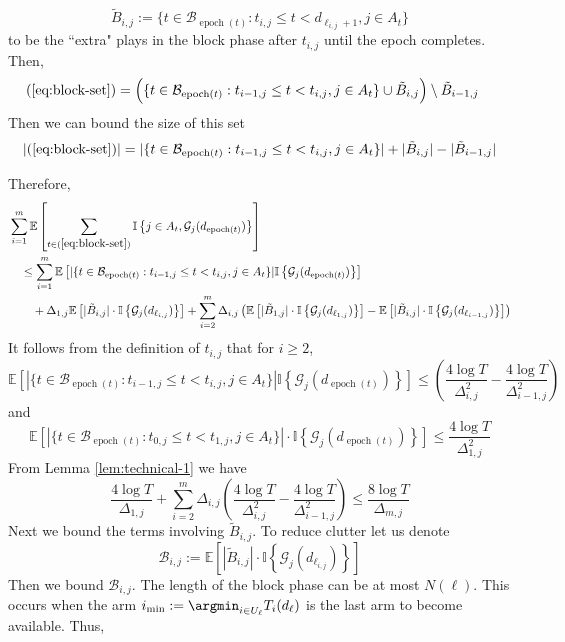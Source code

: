 \documentclass[opre,blindrev]{informs3}
\newcommand{\epoch}{\operatorname{epoch}}
\newcommand{\ind}[1]{\mathbb{I}\left\{#1\right\}}
\newcommand{\bE}[1]{{\mathbb{E}\left[#1\right]}}
\begin{document}
\begin{APPENDICES}
    \[\tilde{B}_{i,j}:= \{t\in \mathcal{B}_{\epoch(t)} : t_{i,j} \leq t < d_{\ell_{i,j}+1}, j\in A_t\} \]
    to be the ``extra" plays in the block phase after \(t_{i,j}\) until the epoch completes. Then,
    \begin{align*}
        (\ref{eq:block-set})
        &= \Big(\{t\in \mathcal{B}_{\epoch(t)} : t_{i-1,j} \leq t < t_{i,j}, j\in A_t\} \cup \tilde{B}_{i,j}\Big) \setminus \tilde{B}_{i-1,j}
    \end{align*}
    Then we can bound the size of this set
    \[
        |(\ref{eq:block-set})| = |\{t\in \mathcal{B}_{\epoch(t)} : t_{i-1,j} \leq t < t_{i,j}, j\in A_t\}| + |\tilde{B}_{i,j}| -  |\tilde{B}_{i-1,j}|
    \]
    
    Therefore,
    \begin{align*}
        &\sum_{i=1}^m\bE{\sum_{t \in (\ref{eq:block-set})}\ind{j \in A_t, \mathcal{G}_j(d_{\epoch(t)})}}\\
        &\quad \leq \sum_{i=1}^m\bE{|\{t\in \mathcal{B}_{\epoch(t)} : t_{i-1,j} \leq t < t_{i,j}, j\in A_t\}|\ind{ \mathcal{G}_j(d_{\epoch(t)})}}\\
        &\qquad + \Delta_{1,j}\bE{|\tilde{B}_{i,j}|\cdot \ind{\mathcal{G}_j(d_{\ell_{i,j}})}}+ \sum_{i=2}^m \Delta_{i,j}\left(\bE{|\tilde{B}_{1,j}|\cdot \ind{\mathcal{G}_j(d_{\ell_{1,j}})}} -  \bE{|\tilde{B}_{i,j}|\cdot \ind{\mathcal{G}_j(d_{\ell_{i-1,j}})}}\right)\\
    \end{align*}
    It follows from the definition of \(t_{i,j}\) that for \(i \geq 2\),
    \[\bE{|\{t\in \mathcal{B}_{\epoch(t)} : t_{i-1,j} \leq t < t_{i,j}, j\in A_t\}|\ind{ \mathcal{G}_j(d_{\epoch(t)})}}\leq \left(\frac{4\log T}{\Delta_{i,j}^2} - \frac{4\log T}{\Delta_{i-1,j}^2}\right)\]
    and 
    \[\bE{|\{t\in \mathcal{B}_{\epoch(t)} : t_{0,j} \leq t < t_{1,j}, j\in A_t\}|\cdot \ind{ \mathcal{G}_j(d_{\epoch(t)})}}\leq \frac{4\log T}{\Delta_{1,j}^2}\]
    From Lemma \ref{lem:technical-1} we have 
    \begin{equation}\label{eq:block-pull-bound-1}
        \frac{4\log T}{\Delta_{1,j}}+\sum_{i=2}^m \Delta_{i,j}\left(\frac{4\log T}{\Delta_{i,j}^2} - \frac{4\log T}{\Delta_{i-1,j}^2}\right)\leq \frac{8\log T}{\Delta_{m,j}}
    \end{equation}
    Next we bound the terms involving \(\tilde{B}_{i,j}\). To reduce clutter let us denote 
    \[\mathcal{B}_{i,j}:=\bE{|\tilde{B}_{i,j}|\cdot \ind{\mathcal{G}_j(d_{\ell_{i,j}})}}\]
    Then we bound \(\mathcal{B}_{i,j}\). The length of the block phase can be at most \(N(\ell)\). This occurs when the arm \(i_{\min}:=\argmin_{i\in U_\ell} T_i(d_\ell)\) is the last arm to become available. Thus,

\end{APPENDICES}
\end{document}
